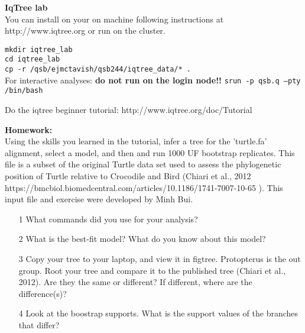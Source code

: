 \documentclass{beamer}
\begin{document}
\begin{frame}
\textbf{IqTree lab}\\
You can install on your on machine following instructions at http://www.iqtree.org
or run on the cluster.

\texttt{mkdir iqtree\_lab}\\
\texttt{cd iqtree\_lab}\\
\texttt{cp -r /qsb/ejmctavish/qsb244/iqtree\_data/* .}\\

\medskip
For interactive analyses: \textbf{do not run on the login node!!}
\texttt{srun -p qsb.q --pty /bin/bash}

\medskip
Do the iqtree beginner tutorial: 
http://www.iqtree.org/doc/Tutorial


 
\end{frame}

\begin{frame}

\textbf{Homework:}\\
Using the skills you learned in the tutorial, infer a tree for the 'turtle.fa' alignment, select a model, and then and run 1000 UF bootstrap replicates. 
This file is a subset of the original Turtle data set used to assess the phylogenetic position of Turtle relative to Crocodile and Bird (Chiari et al., 2012 https://bmcbiol.biomedcentral.com/articles/10.1186/1741-7007-10-65 ).
This input file and exercise were developed by Minh Bui. 

     \begin{itemize}
      \item[1] What commands did you use for your analysis?
      \item[2] What is the best-fit model? What do you know about this model?
      \item[3] Copy your tree to your laptop, and view it in figtree. Protopterus is the out group. Root your tree and compare it to the published tree (Chiari et al., 2012). Are they the same or different? If different, where are the difference(s)?
      \item[4] Look at the boostrap supports. What is the support values of the branches that differ?
      
      
     \end{itemize}

        
\end{frame}
\end{document}
